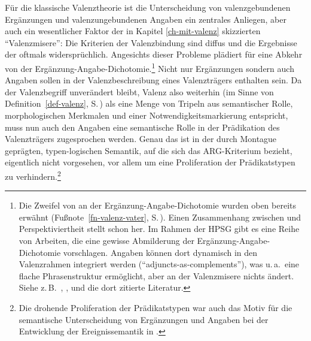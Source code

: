 Für die klassische Valenztheorie ist die Unterscheidung von valenzgebundenen Ergänzungen und valenzungebundenen Angaben ein zentrales Anliegen, aber auch ein wesentlicher Faktor der in Kapitel \ref{ch-mit-valenz} skizzierten "`Valenzmisere"': Die Kriterien der Valenzbindung sind diffus und die Ergebnisse der  oftmals widersprüchlich. Angesichts dieser Probleme plädiert \cite{Storrer:92} für eine Abkehr von der Ergänzung-Angabe-Dichotomie.\footnote{Die Zweifel von \cite{Vater:78} an der Ergänzung-Angabe-Dichotomie wurden oben bereits erwähnt (Fußnote~\ref{fn-valenz-vater}, S.\,\pageref{fn-valenz-vater}). Einen Zusammenhang zwischen  und Perspektiviertheit stellt schon \cite{Heringer:84} her. Im Rahmen der HPSG gibt es eine Reihe von Arbeiten, die eine gewisse Abmilderung der Ergänzung-Angabe-Dichotomie vorschlagen. Angaben können dort dynamisch in den Valenzrahmen integriert werden ("`adjuncts-as-complements"'), was u.\,a.\ eine flache Phrasenstruktur ermöglicht, aber an der Valenzmisere nichts ändert. Siehe z.\,B.\ \citet[Kapitel~9]{Przepiorkowski:99}, \cite{Bouma:etal:01}, \cite{Bouma:03} und die dort zitierte Literatur.} Nicht nur Ergänzungen sondern auch Angaben sollen in der Valenzbeschreibung eines Valenzträgers enthalten sein. Da der Valenzbegriff unverändert bleibt, Valenz also weiterhin (im Sinne von Definition~\ref{def-valenz}, S.\,\pageref{def-valenz}) als eine Menge von Tripeln aus semantischer Rolle, morphologischen Merkmalen und einer Notwendigkeitsmarkierung entspricht, muss nun auch den Angaben eine semantische Rolle in der Prädikation des Valenzträgers zugesprochen werden. Genau das ist in der durch Montague geprägten, typen-logischen Semantik, auf die sich das ARG-Kriterium bezieht, eigentlich nicht vorgesehen, vor allem um eine Proliferation der Prädikatstypen zu verhindern.\footnote{Die drohende Proliferation der Prädikatstypen war auch das Motiv für die semantische Unterscheidung von Ergänzungen und Angaben bei der Entwicklung der Ereignissemantik in \cite{Davidson:67}.} 

